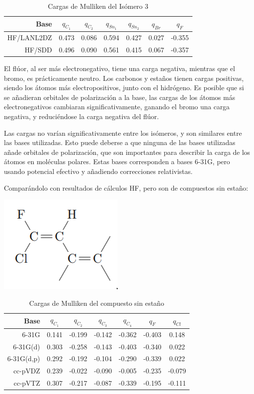 \documentclass[12pt]{article}
\begin{document}
\begin{table}[H]
\centering
    \begin{tabular}{rcccccc}
        \hline
        Base & $q_{C_1}$ & $q_{C_2}$ & $q_{Sn_1}$ & $q_{Sn_2}$ & $q_{Br}$ & $q_{F}$ \\
        \hline
        HF/LANL2DZ  & 0.473 & 0.086 & 0.594 & 0.427 & 0.027 & -0.355 \\
        HF/SDD      & 0.496 & 0.090 & 0.561 & 0.415 & 0.067 & -0.357 \\
        \hline
    \end{tabular}
    \caption{Cargas de Mulliken del Isómero 3}
\end{table}

El flúor, al ser más electronegativo, tiene una carga negativa, mientras que el bromo, es prácticamente neutro. Los carbonos y estaños tienen cargas positivas, siendo los átomos más electropositivos, junto con el hidrógeno. Es posible que si se añadieran orbitales de polarización a la base, las cargas de los átomos más electronegativos cambiaran significativamente, ganando el bromo una carga negativa, y reduciéndose la carga negativa del flúor.

Las cargas no varían significativamente entre los isómeros, y son similares entre las bases utilizadas. Esto puede deberse a que ninguna de las bases utilizadas añade orbitales de polarización, que son importantes para describir la carga de los átomos en moléculas polares. Estas bases corresponden a bases 6-31G\cite{batista_gaussian}, pero usando potencial efectivo y añadiendo correcciones relativistas.

Comparándolo con resultados de cálculos HF, pero son de compuestos sin estaño:
\begin{center}
    \includegraphics[height=0.14\textwidth]{ISO1.png}
\end{center}


\begin{table}[H]
\centering
    \begin{tabular}{rcccccc}
        \hline
        Base & $q_{C_1}$ & $q_{C_2}$ & $q_{C_3}$ & $q_{C_4}$ & $q_{F}$ & $q_{Cl}$ \\
        \hline
        6-31G      & 0.141 & -0.199 & -0.142 & -0.362 & -0.403 & 0.148 \\
        6-31G(d)   & 0.303 & -0.258 & -0.143 & -0.403 & -0.340 & 0.022 \\
        6-31G(d,p) & 0.292 & -0.192 & -0.104 & -0.290 & -0.339 & 0.022 \\
        cc-pVDZ    & 0.239 & -0.022 & -0.090 & -0.005 & -0.235 & -0.079 \\
        cc-pVTZ    & 0.307 & -0.217 & -0.087 & -0.339 & -0.195 & -0.111 \\
        \hline
    \end{tabular}
    \caption{Cargas de Mulliken del compuesto sin estaño}
\end{table}
\end{document}
